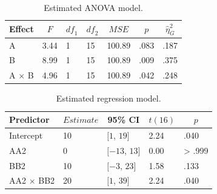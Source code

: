 \documentclass[12pt,]{krantz}
\newenvironment{Shaded}{\begin{snugshade}}{\end{snugshade}}
\newcommand{\DataTypeTok}[1]{\textcolor[rgb]{0.13,0.29,0.53}{#1}}
\newcommand{\DecValTok}[1]{\textcolor[rgb]{0.00,0.00,0.81}{#1}}
\newcommand{\KeywordTok}[1]{\textcolor[rgb]{0.13,0.29,0.53}{\textbf{#1}}}
\newcommand{\NormalTok}[1]{#1}
\newcommand{\OperatorTok}[1]{\textcolor[rgb]{0.81,0.36,0.00}{\textbf{#1}}}
\newcommand{\StringTok}[1]{\textcolor[rgb]{0.31,0.60,0.02}{#1}}
\theoremstyle{definition}
\theoremstyle{definition}
\theoremstyle{definition}
\theoremstyle{remark}
\begin{document}
\begin{table}[!htbp]

\begin{center}
\begin{threeparttable}

\caption{\label{tab:table16}Estimated ANOVA model.}

\begin{tabular}{lllllll}
\toprule
Effect & \multicolumn{1}{c}{$F$} & \multicolumn{1}{c}{$\mathit{df}_1$} & \multicolumn{1}{c}{$\mathit{df}_2$} & \multicolumn{1}{c}{$\mathit{MSE}$} & \multicolumn{1}{c}{$p$} & \multicolumn{1}{c}{$\hat{\eta}^2_G$}\\
\midrule
A & 3.44 & 1 & 15 & 100.89 & .083 & .187\\
B & 8.99 & 1 & 15 & 100.89 & .009 & .375\\
A $\times$ B & 4.96 & 1 & 15 & 100.89 & .042 & .248\\
\bottomrule
\end{tabular}

\end{threeparttable}
\end{center}

\end{table}

\begin{Shaded}
\end{Shaded}

\begin{table}[!htbp]

\begin{center}
\begin{threeparttable}

\caption{\label{tab:table17}Estimated regression model.}

\begin{tabular}{lllll}
\toprule
Predictor & \multicolumn{1}{c}{$Estimate$} & \multicolumn{1}{c}{95\% CI} & \multicolumn{1}{c}{$t(16)$} & \multicolumn{1}{c}{$p$}\\
\midrule
Intercept & 10 & $[1$, $19]$ & 2.24 & .040\\
AA2 & 0 & $[-13$, $13]$ & 0.00 & > .999\\
BB2 & 10 & $[-3$, $23]$ & 1.58 & .133\\
AA2 $\times$ BB2 & 20 & $[1$, $39]$ & 2.24 & .040\\
\bottomrule
\end{tabular}

\end{threeparttable}
\end{center}

\end{table}
\end{document}
